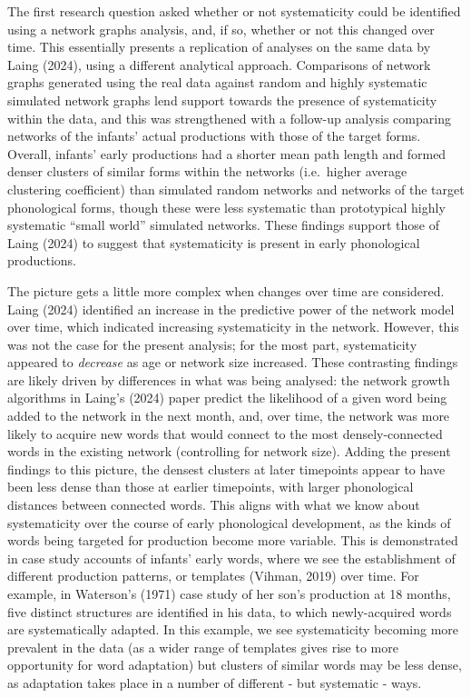 \documentclass[
  man]{apa6}
\begin{document}
The first research question asked whether or not systematicity could be identified using a network graphs analysis, and, if so, whether or not this changed over time. This essentially presents a replication of analyses on the same data by Laing (2024), using a different analytical approach. Comparisons of network graphs generated using the real data against random and highly systematic simulated network graphs lend support towards the presence of systematicity within the data, and this was strengthened with a follow-up analysis comparing networks of the infants' actual productions with those of the target forms. Overall, infants' early productions had a shorter mean path length and formed denser clusters of similar forms within the networks (i.e.~higher average clustering coefficient) than simulated random networks and networks of the target phonological forms, though these were less systematic than prototypical highly systematic ``small world'' simulated networks. These findings support those of Laing (2024) to suggest that systematicity is present in early phonological productions.

The picture gets a little more complex when changes over time are considered. Laing (2024) identified an increase in the predictive power of the network model over time, which indicated increasing systematicity in the network. However, this was not the case for the present analysis; for the most part, systematicity appeared to \emph{decrease} as age or network size increased. These contrasting findings are likely driven by differences in what was being analysed: the network growth algorithms in Laing's (2024) paper predict the likelihood of a given word being added to the network in the next month, and, over time, the network was more likely to acquire new words that would connect to the most densely-connected words in the existing network (controlling for network size). Adding the present findings to this picture, the densest clusters at later timepoints appear to have been less dense than those at earlier timepoints, with larger phonological distances between connected words. This aligns with what we know about systematicity over the course of early phonological development, as the kinds of words being targeted for production become more variable. This is demonstrated in case study accounts of infants' early words, where we see the establishment of different production patterns, or templates (Vihman, 2019) over time. For example, in Waterson's (1971) case study of her son's production at 18 months, five distinct structures are identified in his data, to which newly-acquired words are systematically adapted. In this example, we see systematicity becoming more prevalent in the data (as a wider range of templates gives rise to more opportunity for word adaptation) but clusters of similar words may be less dense, as adaptation takes place in a number of different - but systematic - ways.
\end{document}
